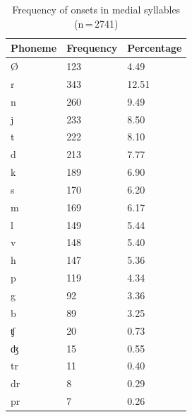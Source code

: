%
\begin{table}\centering
\caption[Frequency of onsets in medial syllables]{Frequency of onsets in medial
syllables (n\,=\,2741)}
\begin{tabu} to 0.67\linewidth{X X[c] X[c]}
\tableheaderfont\toprule
Phoneme
	& Frequency
	& Percentage
	\\
	
\toprule

Ø
	& 123
	& 4.49\pct
	\\

\midrule

r
	& 343
	& 12.51\pct
	\\

n
	& 260
	& 9.49\pct
	\\

j
	& 233
	& 8.50\pct
	\\

t
	& 222
	& 8.10\pct
	\\

d
	& 213
	& 7.77\pct
	\\

k
	& 189
	& 6.90\pct
	\\

s
	& 170
	& 6.20\pct
	\\

m
	& 169
	& 6.17\pct
	\\

l
	& 149
	& 5.44\pct
	\\

v
	& 148
	& 5.40\pct
	\\

h
	& 147
	& 5.36\pct
	\\

p
	& 119
	& 4.34\pct
	\\

g
	& 92
	& 3.36\pct
	\\

b
	& 89
	& 3.25\pct
	\\

ʧ
	& 20
	& 0.73\pct
	\\

ʤ
	& 15
	& 0.55\pct
	\\

tr
	& 11
	& 0.40\pct
	\\

dr
	& 8
	& 0.29\pct
	\\

pr
	& 7
	& 0.26\pct
	\\


\end{tabu}
\end{table}

